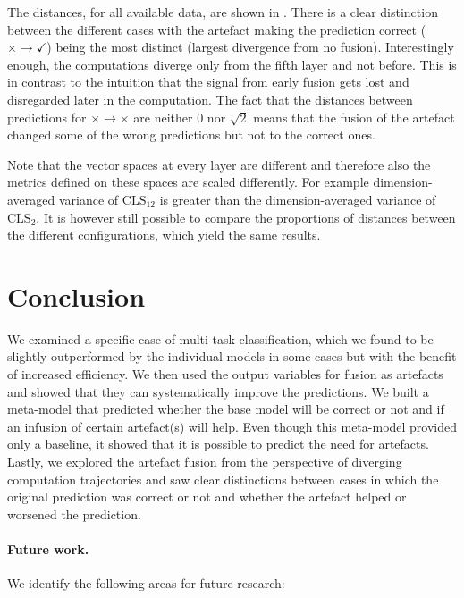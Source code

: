 The distances, for all available data, are shown in .
There is a clear distinction between the different cases with the artefact making the prediction correct ($\times \rightarrow \checkmark$) being the most distinct (largest divergence from no fusion).
Interestingly enough, the computations diverge only from the fifth layer and not before.
This is in contrast to the intuition that the signal from early fusion gets lost and disregarded later in the computation.
The fact that the distances between predictions for $\times \rightarrow \times$ are neither 0 nor $\sqrt{2}$ means that the fusion of the artefact changed some of the wrong predictions but not to the correct ones.

Note that the vector spaces at every layer are different and therefore also the metrics defined on these spaces are scaled differently.
For example dimension-averaged variance of $\text{CLS}_{12}$ is greater than the dimension-averaged variance of $\text{CLS}_{2}$.
It is however still possible to compare the proportions of distances between the different configurations, which yield the same results.

\section{Conclusion} \label{sec:conclusion}

We examined a specific case of multi-task classification, which we found to be slightly outperformed by the individual models in some cases but with the benefit of increased efficiency.
We then used the output variables for fusion as artefacts and showed that they can systematically improve the predictions.
We built a meta-model that predicted whether the base model will be correct or not and if an infusion of certain artefact(s) will help.
Even though this meta-model provided only a baseline, it showed that it is possible to predict the need for artefacts.
Lastly, we explored the artefact fusion from the perspective of diverging computation trajectories and saw clear distinctions between cases in which the original prediction was correct or not and whether the artefact helped or worsened the prediction.

\paragraph{Future work.}

We identify the following areas for future research:

